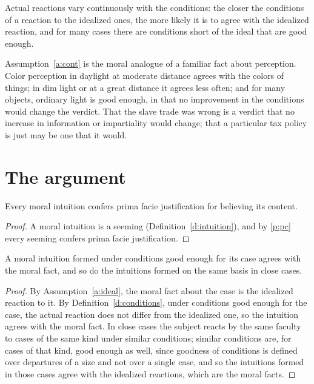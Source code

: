 \documentclass{situationist-preprint}
\begin{document}
\begin{assumption}[Continuity]\label{a:cont}
Actual reactions vary continuously with the conditions: the closer the conditions of a reaction to the idealized ones, the more likely it is to agree with the idealized reaction, and for many cases there are conditions short of the ideal that are good enough.
\end{assumption}

Assumption~\ref{a:cont} is the moral analogue of a familiar fact about perception. Color perception in daylight at moderate distance agrees with the colors of things; in dim light or at a great distance it agrees less often; and for many objects, ordinary light is good enough, in that no improvement in the conditions would change the verdict. That the slave trade was wrong is a verdict that no increase in information or impartiality would change; that a particular tax policy is just may be one that it would.

\section{The argument}

\begin{lemma}[Justification]\label{l:just}
Every moral intuition confers prima facie justification for believing its content.
\end{lemma}

\begin{proof}
A moral intuition is a seeming (Definition~\ref{d:intuition}), and by \ref{p:pc} every seeming confers prima facie justification.
\end{proof}

\begin{lemma}[Reliability]\label{l:rel}
A moral intuition formed under conditions good enough for its case agrees with the moral fact, and so do the intuitions formed on the same basis in close cases.
\end{lemma}

\begin{proof}
By Assumption~\ref{a:ideal}, the moral fact about the case is the idealized reaction to it. By Definition~\ref{d:conditions}, under conditions good enough for the case, the actual reaction does not differ from the idealized one, so the intuition agrees with the moral fact. In close cases the subject reacts by the same faculty to cases of the same kind under similar conditions; similar conditions are, for cases of that kind, good enough as well, since goodness of conditions is defined over departures of a size and not over a single case, and so the intuitions formed in those cases agree with the idealized reactions, which are the moral facts.
\end{proof}
\end{document}
